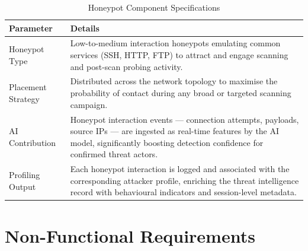 \documentclass[12pt,a4paper]{report}
\begin{document}
\begin{table}[h!]
\centering
\caption{Honeypot Component Specifications}
\begin{tabular}{@{}L{3.5cm} L{11cm}@{}}
  \toprule
  \textbf{Parameter} & \textbf{Details} \\
  \midrule
  Honeypot Type
    & Low-to-medium interaction honeypots emulating common services (SSH, HTTP, FTP)
      to attract and engage scanning and post-scan probing activity. \\
  \addlinespace
  Placement Strategy
    & Distributed across the network topology to maximise the probability of contact
      during any broad or targeted scanning campaign. \\
  \addlinespace
  AI Contribution
    & Honeypot interaction events --- connection attempts, payloads, source IPs --- are
      ingested as real-time features by the AI model, significantly boosting detection
      confidence for confirmed threat actors. \\
  \addlinespace
  Profiling Output
    & Each honeypot interaction is logged and associated with the corresponding attacker
      profile, enriching the threat intelligence record with behavioural indicators and
      session-level metadata. \\
  \bottomrule
\end{tabular}
\label{tab:honeypot-specs}
\end{table}

\chapter{Non-Functional Requirements}
\end{document}
